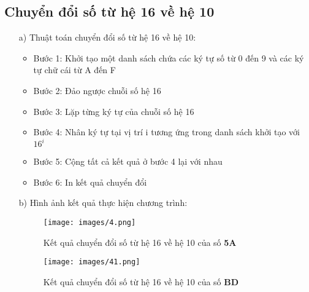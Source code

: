 \documentclass[20pt]{article}
\begin{document}
\subsection{Chuyển đổi số từ hệ 16 về hệ 10}
\begin{enumerate}
    \item[a)] Thuật toán chuyển đổi số từ hệ 16 về hệ 10:
    \begin{itemize}
        \item Bước 1: Khởi tạo một danh sách chứa các ký tự số từ 0 đến 9 và các ký tự chữ cái từ A đến F
        \item Bước 2: Đảo ngược chuỗi số hệ 16
        \item Bước 3: Lặp từng ký tự của chuỗi số hệ 16
        \item Bước 4: Nhân ký tự tại vị trí i tương ứng trong danh sách khởi tạo với $16^i$
        \item Bước 5: Cộng tất cả kết quả ở bước 4 lại với nhau
        \item Bước 6: In kết quả chuyển đổi
    \end{itemize}
    \item[b)] Hình ảnh kết quả thực hiện chương trình:
    \begin{figure}[H]
        \centering
        \texttt{[image: images/4.png]}
        \caption{Kết quả chuyển đổi số từ hệ 16 về hệ 10 của số \textbf{5A}}
        \label{fig:my_label}
    \end{figure}
    \begin{figure}[H]
        \centering
        \texttt{[image: images/41.png]}
        \caption{Kết quả chuyển đổi số từ hệ 16 về hệ 10 của số \textbf{BD}}
        \label{fig:my_label}
    \end{figure}
\end{enumerate}

\end{document}
